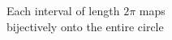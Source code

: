 \documentclass[preview]{standalone}
\begin{document}
\begin{center}
Each interval of length $2\pi$ maps\\bijectively onto the entire circle
\end{center}
\end{document}
